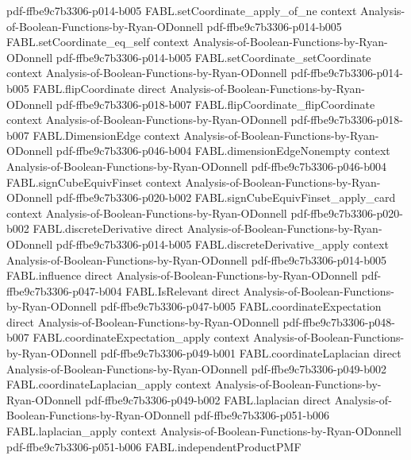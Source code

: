 \begin{theorem}
  {pdf-ffbe9c7b3306-p014-b005}
\proofstep
  {FABL.setCoordinate_apply_of_ne}
  {context}
  {Analysis-of-Boolean-Functions-by-Ryan-ODonnell}
  {pdf-ffbe9c7b3306-p014-b005}
\proofstep
  {FABL.setCoordinate_eq_self}
  {context}
  {Analysis-of-Boolean-Functions-by-Ryan-ODonnell}
  {pdf-ffbe9c7b3306-p014-b005}
\proofstep
  {FABL.setCoordinate_setCoordinate}
  {context}
  {Analysis-of-Boolean-Functions-by-Ryan-ODonnell}
  {pdf-ffbe9c7b3306-p014-b005}
\proofstep
  {FABL.flipCoordinate}
  {direct}
  {Analysis-of-Boolean-Functions-by-Ryan-ODonnell}
  {pdf-ffbe9c7b3306-p018-b007}
\proofstep
  {FABL.flipCoordinate_flipCoordinate}
  {context}
  {Analysis-of-Boolean-Functions-by-Ryan-ODonnell}
  {pdf-ffbe9c7b3306-p018-b007}
\proofstep
  {FABL.DimensionEdge}
  {context}
  {Analysis-of-Boolean-Functions-by-Ryan-ODonnell}
  {pdf-ffbe9c7b3306-p046-b004}
\proofstep
  {FABL.dimensionEdgeNonempty}
  {context}
  {Analysis-of-Boolean-Functions-by-Ryan-ODonnell}
  {pdf-ffbe9c7b3306-p046-b004}
\proofstep
  {FABL.signCubeEquivFinset}
  {context}
  {Analysis-of-Boolean-Functions-by-Ryan-ODonnell}
  {pdf-ffbe9c7b3306-p020-b002}
\proofstep
  {FABL.signCubeEquivFinset_apply_card}
  {context}
  {Analysis-of-Boolean-Functions-by-Ryan-ODonnell}
  {pdf-ffbe9c7b3306-p020-b002}
\proofstep
  {FABL.discreteDerivative}
  {direct}
  {Analysis-of-Boolean-Functions-by-Ryan-ODonnell}
  {pdf-ffbe9c7b3306-p014-b005}
\proofstep
  {FABL.discreteDerivative_apply}
  {context}
  {Analysis-of-Boolean-Functions-by-Ryan-ODonnell}
  {pdf-ffbe9c7b3306-p014-b005}
\proofstep
  {FABL.influence}
  {direct}
  {Analysis-of-Boolean-Functions-by-Ryan-ODonnell}
  {pdf-ffbe9c7b3306-p047-b004}
\proofstep
  {FABL.IsRelevant}
  {direct}
  {Analysis-of-Boolean-Functions-by-Ryan-ODonnell}
  {pdf-ffbe9c7b3306-p047-b005}
\proofstep
  {FABL.coordinateExpectation}
  {direct}
  {Analysis-of-Boolean-Functions-by-Ryan-ODonnell}
  {pdf-ffbe9c7b3306-p048-b007}
\proofstep
  {FABL.coordinateExpectation_apply}
  {context}
  {Analysis-of-Boolean-Functions-by-Ryan-ODonnell}
  {pdf-ffbe9c7b3306-p049-b001}
\proofstep
  {FABL.coordinateLaplacian}
  {direct}
  {Analysis-of-Boolean-Functions-by-Ryan-ODonnell}
  {pdf-ffbe9c7b3306-p049-b002}
\proofstep
  {FABL.coordinateLaplacian_apply}
  {context}
  {Analysis-of-Boolean-Functions-by-Ryan-ODonnell}
  {pdf-ffbe9c7b3306-p049-b002}
\proofstep
  {FABL.laplacian}
  {direct}
  {Analysis-of-Boolean-Functions-by-Ryan-ODonnell}
  {pdf-ffbe9c7b3306-p051-b006}
\proofstep
  {FABL.laplacian_apply}
  {context}
  {Analysis-of-Boolean-Functions-by-Ryan-ODonnell}
  {pdf-ffbe9c7b3306-p051-b006}
\proofstep
  {FABL.independentProductPMF}

\end{theorem}
